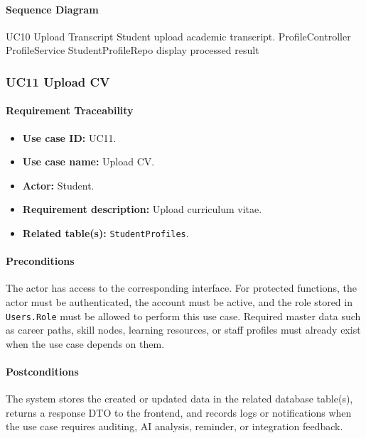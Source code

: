 \paragraph{Sequence Diagram}

\SequenceDiagram
{UC10 Upload Transcript}
{Student}
{upload academic transcript.}
{ProfileController}
{ProfileService}
{StudentProfileRepo}
{display processed result}

\subsubsection{UC11 Upload CV}

\paragraph{Requirement Traceability}

\begin{itemize}
    \item \textbf{Use case ID:} UC11.
    \item \textbf{Use case name:} Upload CV.
    \item \textbf{Actor:} Student.
    \item \textbf{Requirement description:} Upload curriculum vitae.
    \item \textbf{Related table(s):} \texttt{StudentProfiles}.
\end{itemize}

\paragraph{Preconditions}

The actor has access to the corresponding interface. For protected functions, the actor must be authenticated, the account must be active, and the role stored in \texttt{Users.Role} must be allowed to perform this use case. Required master data such as career paths, skill nodes, learning resources, or staff profiles must already exist when the use case depends on them.

\paragraph{Postconditions}

The system stores the created or updated data in the related database table(s), returns a response DTO to the frontend, and records logs or notifications when the use case requires auditing, AI analysis, reminder, or integration feedback.


